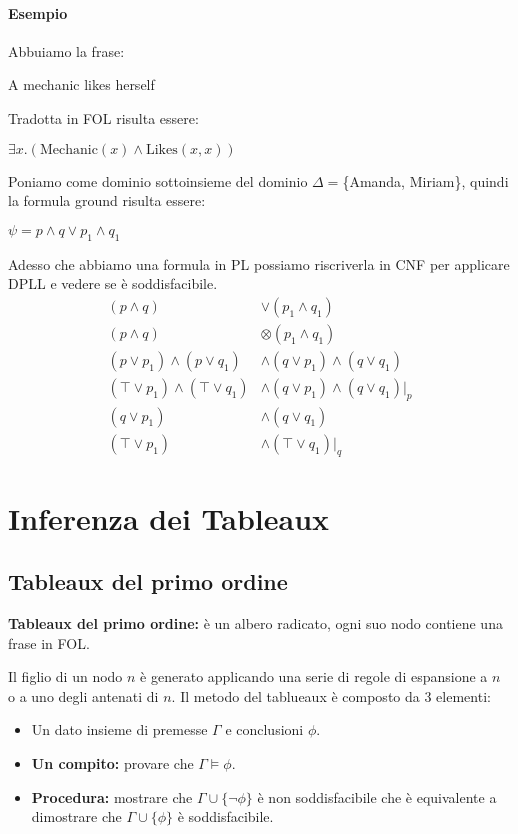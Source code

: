 \documentclass[../main.tex]{subfiles}
\begin{document}
  \subsubsection{Esempio}
  Abbuiamo la frase:
  \begin{center}
      A mechanic likes herself
  \end{center}
  Tradotta in FOL risulta essere:
  \begin{center}
      $\exists x.(\text{Mechanic}(x) \land \text{Likes}(x, x))$
  \end{center}
  Poniamo come dominio sottoinsieme del dominio $\Delta=$\{Amanda, Miriam\}, quindi la formula ground risulta essere:
  \begin{center}
      $\psi = p \land q \lor p_1 \land q_1$
  \end{center}
  Adesso che abbiamo una formula in PL possiamo riscriverla in CNF per applicare DPLL e vedere se è soddisfacibile.
  \begin{align*}
      (p \land q) & \lor (p_1 \land q_1)\\
      (p \land q)  & \otimes (p_1 \land q_1)\\
      (p \lor p_1) \land (p \lor q_1) & \land (q \lor p_1) \land (q \lor q_1)\\
      ( \top \lor p_1) \land ( \top \lor q_1) & \land (q \lor p_1) \land (q \lor q_1)|_p\\
      (q \lor p_1) & \land (q \lor q_1)\\
      ( \top \lor p_1) & \land ( \top \lor q_1)|_q
  \end{align*}

  \chapter{Inferenza dei Tableaux}
  \section{Tableaux del primo ordine}
  \textbf{Tableaux del primo ordine:} è un albero radicato, ogni suo nodo contiene una frase in FOL.

  Il figlio di un nodo $n$ è generato applicando una serie di regole di espansione a $n$ o a uno degli antenati di $n$.
  \spazio
  Il metodo del tablueaux è composto da 3 elementi:
  \begin{itemize}
      \item Un dato insieme di premesse $\Gamma$ e conclusioni $\phi$.
      \item \textbf{Un compito:} provare che $\Gamma \models \phi$.
      \item \textbf{Procedura:} mostrare che $\Gamma \cup \{ \lnot \phi \}$ è non soddisfacibile che è equivalente a dimostrare che $\Gamma \cup \{ \phi \}$ è soddisfacibile.
  \end{itemize}
\end{document}
